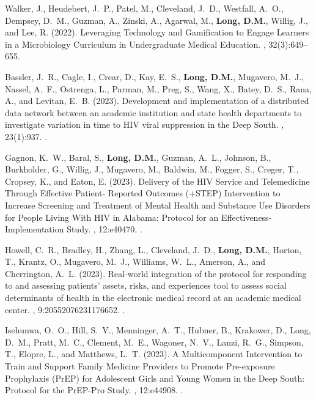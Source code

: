 \begin{thebibliography}{}
Walker, J., Heudebert, J.~P., Patel, M., Cleveland, J.~D., Westfall, A.~O.,
  Dempsey, D.~M., Guzman, A., Zinski, A., Agarwal, M., \textbf{Long, D.M.}, Willig, J.,
  and Lee, R. (2022).
\newblock Leveraging {Technology} and {Gamification} to {Engage} {Learners} in
  a {Microbiology} {Curriculum} in {Undergraduate} {Medical} {Education}.
, 32(3):649--655.


Bassler, J.~R., Cagle, I., Crear, D., Kay, E.~S., \textbf{Long, D.M.}, Mugavero, M.~J.,
  Nassel, A.~F., Ostrenga, L., Parman, M., Preg, S., Wang, X., Batey, D.~S.,
  Rana, A., and Levitan, E.~B. (2023).
\newblock Development and implementation of a distributed data network between
  an academic institution and state health departments to investigate variation
  in time to {HIV} viral suppression in the {Deep} {South}.
, 23(1):937.
.  


Gagnon, K.~W., Baral, S., \textbf{Long, D.M.}, Guzman, A.~L., Johnson, B., Burkholder, G.,
  Willig, J., Mugavero, M., Baldwin, M., Fogger, S., Creger, T., Cropsey, K.,
  and Eaton, E. (2023).
\newblock Delivery of the {HIV} {Service} and {Telemedicine} {Through}
  {Effective} {Patient}- {Reported} {Outcomes} (+{STEP}) {Intervention} to
  {Increase} {Screening} and {Treatment} of {Mental} {Health} and {Substance}
  {Use} {Disorders} for {People} {Living} {With} {HIV} in {Alabama}: {Protocol}
  for an {Effectiveness}-{Implementation} {Study}.
, 12:e40470.
.  


Howell, C.~R., Bradley, H., Zhang, L., Cleveland, J.~D., \textbf{Long, D.M.}, Horton, T.,
  Krantz, O., Mugavero, M.~J., Williams, W.~L., Amerson, A., and Cherrington,
  A.~L. (2023).
\newblock Real-world integration of the protocol for responding to and
  assessing patients' assets, risks, and experiences tool to assess social
  determinants of health in the electronic medical record at an academic
  medical center.
, 9:20552076231176652.
.  


Isehunwa, O.~O., Hill, S.~V., Menninger, A.~T., Hubner, B., Krakower, D., Long,
  D.~M., Pratt, M.~C., Clement, M.~E., Wagoner, N.~V., Lanzi, R.~G., Simpson,
  T., Elopre, L., and Matthews, L.~T. (2023).
\newblock A {Multicomponent} {Intervention} to {Train} and {Support} {Family}
  {Medicine} {Providers} to {Promote} {Pre}-exposure {Prophylaxis} ({PrEP}) for
  {Adolescent} {Girls} and {Young} {Women} in the {Deep} {South}: {Protocol}
  for the {PrEP}-{Pro} {Study}.
, 12:e44908.
.  



\end{thebibliography}
